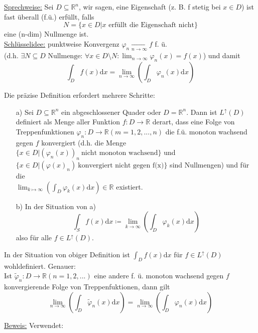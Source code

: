 \underline{Sprechweise:} Sei $D \subseteq \mathbb{R}^n$, wir sagen, eine Eigenschaft (z. B. f stetig bei $x \in D$) ist fast überall (f.ü.) erfüllt, falls
\[N=\{x \in D | x \text{ erfüllt die Eigenschaft nicht}\}\]
eine (n-dim) Nullmenge ist.\\

\underline{Schlüsselidee:} punktweise Konvergenz $\varphi_n \xrightarrow[n \to \infty]{}f$ f. ü.\\
	(d.h. $\exists N \subseteq D \text{ Nullmenge: } \forall x \in D \setminus N \colon \lim_{n \to \infty} \varphi_n(x)=f(x)$) und damit
	\[\int_D f(x) \text{d}x = \lim_{n \to \infty} \left(\int_D \varphi_n(x) \text{d}x\right)\]

Die präzise Definition erfordert mehrere Schritte:

\begin{definition}\leavevmode
\begin{itemize}
	\item[a)] Sei $D \subseteq \mathbb{R}^n$ ein abgeschlossener Quader oder $D = \mathbb{R}^n$. Dann ist $L^\uparrow(D)$ definiert als Menge aller Funktion $f \colon D \to \mathbb{R}$ derart, dass eine Folge von Treppenfunktionen $\varphi_n \colon D \to \mathbb{R} (m=1,2,...,n)$ die f.ü. monoton wachsend gegen $f$ konvergiert (d.h. die Menge $\{x \in D | (\varphi_n(x))_n\ \text{nicht monoton wachsend}\}$ und $\{x \in D | (\varphi(x)_n)\ \text{konvergiert nicht gegen f(x)}\}$ sind Nullmengen) und für die\\
	$\lim_{k \mapsto \infty} (\int_D \varphi_k(x) \text{d}x) \in \mathbb{R}$ existiert.
	\item[b)]  In der Situation von a)
		\[\int_S f(x) \text{d}x \coloneqq \lim_{k \to \infty} \left(\int_D \varphi_k(x) \text{d}x \right)\] 
		also für alle $f \in L^\uparrow(D)$.
\end{itemize}
\end{definition}

\begin{proposition}
In der Situation von obiger Definition ist $\int_D f(x) \text{d}x$ für $f\in L^\uparrow(D)$ wohldefiniert. Genauer:\\
Ist $\tilde{\varphi}_n \colon D \to \mathbb{R} (n=1,2,...)$ eine andere f. ü. monoton wachsend gegen $f$ konvergierende Folge von Treppenfuktionen, dann gilt
\[\lim_{n \to \infty} \left(\int_D \tilde{\varphi}_n (x) \text{d}x\right) = \lim_{n \to \infty} \left(\int_D \varphi_n(x) \text{d}x\right)\]
\end{proposition}
\underline{Beweis:}
Verwendet:

